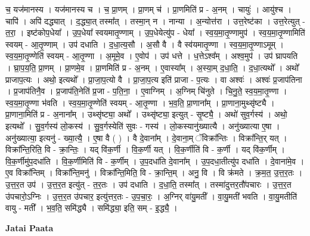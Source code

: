 \documentclass[17pt]{extarticle}
\begin{document}
च॒ यज॑मानस्य । यज॑मानस्य च । च॒ प्रा॒णम् । प्रा॒णम् च॑ । प्रा॒णमिति॑ प्र - अ॒नम् । चायुः॑ । आयु॑श्च । चापि॑ । अपि॑ दद्ध्यात् । द॒द्ध्या॒त् तस्मा᳚त् । तस्मा॒न् न । नान्या । अ॒न्योत्त॑रा । उत्त॒रेष्ट॑का । उत्त॒रेत्युत् - त॒रा॒ । इष्ट॑कोप॒धेया᳚ । उ॒प॒धेया᳚ स्वयमातृ॒ण्णाम् । उ॒प॒धेयेत्यु॑प - धेया᳚ । स्व॒य॒मा॒तृ॒ण्णामुप॑ । स्व॒य॒मा॒तृ॒ण्णामिति॑ स्वयम् - आ॒तृ॒ण्णाम् । उप॑ दधाति । द॒धा॒त्य॒सौ । अ॒सौ वै । वै स्व॑यमातृ॒ण्णा । स्व॒य॒मा॒तृ॒ण्णाऽमूम् । स्व॒य॒मा॒तृ॒ण्णेति॑ स्वयम् - आ॒तृ॒ण्णा । अ॒मूमे॒व । ए॒वोप॑ । उप॑ धत्ते । ध॒त्तेऽश्व᳚म् । अश्व॒मुप॑ । उप॑ घ्रापयति । घ्रा॒प॒य॒ति॒ प्रा॒णम् । प्रा॒णमे॒व । प्रा॒णमिति॑ प्र - अ॒नम् । ए॒वास्या᳚म् । अ॒स्या॒म् द॒धा॒ति॒ । द॒धा॒त्यथो᳚ । अथो᳚ प्राजाप॒त्यः । अथो॒ इत्यथो᳚ । प्रा॒जा॒प॒त्यो वै । प्रा॒जा॒प॒त्य इति॑ प्राजा - प॒त्यः । वा अश्वः॑ । अश्वः॑ प्र॒जाप॑तिना । प्र॒जाप॑तिनै॒व । प्र॒जाप॑ति॒नेति॑ प्र॒जा - प॒ति॒ना॒ । ए॒वाग्निम् । अ॒ग्निम् चि॑नुते । चि॒नु॒ते॒ स्व॒य॒मा॒तृ॒ण्णा । स्व॒य॒मा॒तृ॒ण्णा भ॑वति । स्व॒य॒मा॒तृ॒ण्णेति॑ स्वयम् - आ॒तृ॒ण्णा । भ॒व॒ति॒ प्रा॒णाना᳚म् । प्रा॒णाना॒मुथ्सृ॑ष्ट्यै । प्रा॒णाना॒मिति॑ प्र - अ॒नाना᳚म् । उथ्सृ॑ष्ट्या॒ अथो᳚ । उथ्सृ॑ष्ट्या॒ इत्युत् - सृ॒ष्ट्यै॒ । अथो॑ सुव॒र्गस्य॑ । अथो॒ इत्यथो᳚ । सु॒व॒र्गस्य॑ लो॒कस्य॑ । सु॒व॒र्गस्येति॑ सुवः - गस्य॑ । लो॒कस्यानु॑ख्यात्यै । अनु॑ख्यात्या ए॒षा । अनु॑ख्यात्या॒ इत्यनु॑ - ख्या॒त्यै॒ । ए॒षा वै ( ) । वै दे॒वाना᳚म् । दे॒वाना॒म् ॅविक्रा᳚न्तिः । विक्रा᳚न्ति॒र् यत् । विक्रा᳚न्ति॒रिति॒ वि - क्रा॒न्तिः॒ । यद् वि॑क॒र्णी । वि॒क॒र्णी यत् । वि॒क॒र्णीति॑ वि - क॒र्णी । यद् वि॑क॒र्णीम् । वि॒क॒र्णीमु॑प॒दधा॑ति । वि॒क॒र्णीमिति॑ वि - क॒र्णीम् । उ॒प॒दधा॑ति दे॒वाना᳚म् । उ॒प॒दधा॒तीत्यु॑प दधा॑ति । दे॒वाना॑मे॒व । ए॒व विक्रा᳚न्तिम् । विक्रा᳚न्ति॒मनु॑ । विक्रा᳚न्ति॒मिति॒ वि - क्रा॒न्ति॒म् । अनु॒ वि । वि क्र॑मते । क्र॒म॒त॒ उ॒त्त॒र॒तः । उ॒त्त॒र॒त उप॑ । उ॒त्त॒र॒त इत्यु॑त् - त॒र॒तः । उप॑ दधाति । द॒धा॒ति॒ तस्मा᳚त् । तस्मा॑दुत्तर॒तौ॑पचारः । उ॒त्त॒र॒त उ॑पचारो॒ऽग्निः । उ॒त्त॒र॒त उ॑पचार॒ इत्यु॑त्तर॒तः - उ॒प॒चा॒रः॒ । अ॒ग्निर् वा॑यु॒मती᳚ । वा॒यु॒मती॑ भवति । वा॒यु॒मतीति॑ वायु - मती᳚ । भ॒व॒ति॒ समि॑द्ध्यै । समि॑द्ध्या॒ इति॒ सम् - इ॒द्ध्यै॒ । \newline

\textbf{Jatai Paata} \newline
\end{document}

